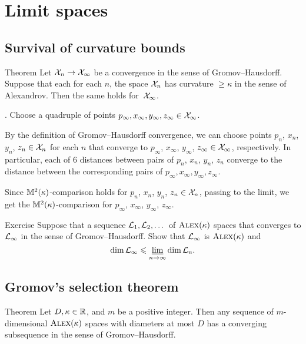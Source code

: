 
\chapter{Limit spaces}\label{chap:lim}\label{chap:stability}


\section{Survival of curvature bounds}

\begin{thm}{Theorem}\label{thm:CBB-closed}
Let $\spc{X}_n\z\to \spc{X}_\infty$ be a convergence in the sense of Gromov--Hausdorff.
Suppose that each for each $n$, the space $\mathcal{X}_n$ has curvature $\ge\kappa$ in the sense of Alexandrov.
Then the same holds for~$\mathcal{X}_\infty$.
\end{thm}

.
Choose a quadruple of points $p_\infty, x_\infty,y_\infty,z_\infty\in \mathcal{X}_\infty$.

By the definition of Gromov--Hausdorff convergence, we can choose points $p_n$,  $x_n$, $y_n$, $z_n\in \mathcal{X}_n$ for each $n$
that converge to $p_\infty$, $x_\infty$, $y_\infty$, $z_\infty\in \mathcal{X}_\infty$, respectively.
In particular, each of 6 distances between pairs of $p_n$, $x_n$, $y_n$, $z_n$ converge to the distance between the corresponding pairs of $p_\infty, x_\infty,y_\infty,z_\infty$.

Since $\mathbb{M}^2(\kappa)$-comparison holds for $p_n$, $x_n$, $y_n$, $z_n\z\in \spc{X}_n$,
passing to the limit, we get the $\mathbb{M}^2(\kappa)$-comparison for $p_\infty$,  $x_\infty$, $y_\infty$, $z_\infty$.
\qeds

\begin{thm}{Exercise}\label{ex:dim-lim}
Suppose that a sequence $\mathcal{L}_1,\mathcal{L}_2,\dots$ of $\textsc{Alex}(\kappa)$ spaces that converges to $\mathcal{L}_\infty$ in the sense of Gromov--Hausdorff.
Show that $\mathcal{L}_\infty$ is $\textsc{Alex}(\kappa)$ and
\[\operatorname{\rm dim}\nolimits \mathcal{L}_\infty\leqslant \varliminf_{n\to\infty} \operatorname{\rm dim}\nolimits \mathcal{L}_n.\]
\end{thm}

\section{Gromov's selection theorem}

\begin{thm}{Theorem}\label{thm:gromov-compactness}
Let $D,\kappa\in\mathbb{R}$, and $m$ be a positive integer. 
Then any sequence of $m$-dimensional $\textsc{Alex}(\kappa)$ spaces with diameters at most $D$
has a converging subsequence in the sense of Gromov--Hausdorff.
\end{thm}

